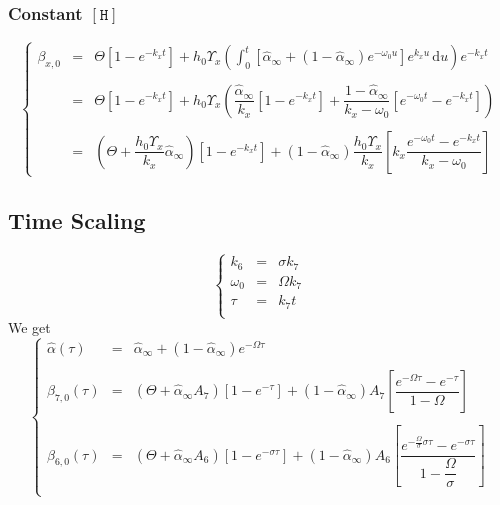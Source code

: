 \documentclass[aps,onecolumn,12pt]{revtex4}
\newcommand{\mychem}[1]{\mathtt{#1}}
\newcommand{\myconc}[1]{\left\lbrack{#1}\right\rbrack}
\newcommand{\spproton}{\mychem{H}}
\newcommand{\proton}{\myconc{\spproton}}
\begin{document}
\subsubsection{Constant $\proton$}
\begin{equation}
\left\lbrace
\begin{array}{rcl}
\beta_{x,0} & = & \displaystyle \Theta \left[1-e^{-k_xt}\right] +h_0 \Upsilon_x
\left( \int_0^t \left[\hat\alpha_\infty + \left(1-\hat\alpha_\infty\right) e^{-\omega_0 u} \right]e^{k_xu} \,\mathrm{d}u \right) e^{-k_x t} \\
\\
& = & \displaystyle \Theta \left[1-e^{-k_xt}\right] +
h_0 \Upsilon_x 
	\left( 
		\dfrac{\hat\alpha_\infty}{k_x}\left[1-e^{-k_xt}\right]  
		+ \dfrac{1-\hat\alpha_\infty}{k_x - \omega_0}\left[e^{-\omega_0t} - e^{-k_xt}\right]
	\right)\\
\\
& = & \left(\Theta+\dfrac{h_0\Upsilon_x}{k_x} \hat{\alpha}_\infty\right) \left[1-e^{-k_xt}\right] + (1-\hat\alpha_\infty) \dfrac{h_0\Upsilon_x}{k_x} \left[ k_x \dfrac{e^{-\omega_0t} - e^{-k_xt}}{k_x - \omega_0}\right]
\end{array}
\right.
\end{equation}


\subsection{Time Scaling}
\begin{equation}
\left\lbrace
\begin{array}{rcl}
	k_6      & = & \sigma k_7\\
	\omega_0 & = & \Omega k_7\\
	\tau     & = & k_7 t\\
\end{array}
\right.
\end{equation}
We get
\begin{equation}
\left\lbrace
\begin{array}{rcl}
	\hat\alpha(\tau)  & = & \hat\alpha_\infty + \left(1-\hat\alpha_\infty\right) e^{-\Omega \tau}\\
	\\
	\beta_{7,0}(\tau) & = & \left( \Theta + \hat\alpha_\infty A_7 \right)  \left[1-e^{-\tau}\right]
	+ \left(1-\hat\alpha_\infty\right) A_7 \left[\dfrac{e^{-\Omega\tau} - e^{-\tau}}{1-\Omega}\right]\\
	\\
	\beta_{6,0}(\tau) & = & \left( \Theta + \hat\alpha_\infty A_6 \right)  \left[1-e^{-\sigma\tau}\right]
	+ \left(1-\hat\alpha_\infty\right) A_6 \left[\dfrac{e^{-\frac{\Omega}{\sigma}\sigma\tau} - e^{-\sigma\tau}}{1-\dfrac{\Omega}{\sigma}}\right]\\
\end{array}
\right.
\end{equation}
\end{document}
